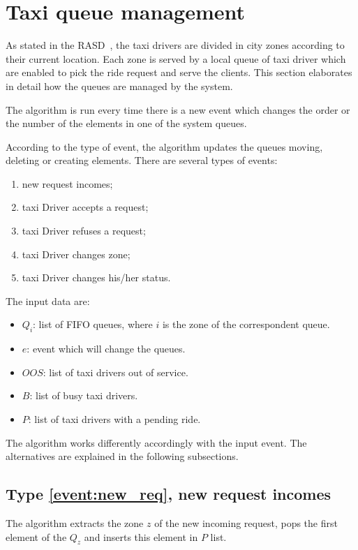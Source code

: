 \section{Taxi queue management}
As stated in the RASD~\cite{rasd}, the taxi drivers are divided in city zones according to their current location. Each zone is served by a local queue of taxi driver which are enabled to pick the ride request and serve the clients. This section elaborates in detail how the queues are managed by the system.

The algorithm is run every time there is a new event which changes the order or the number of the elements in one of the system queues.

According to the type of event, the algorithm updates the queues moving, deleting or creating elements. There are several types of events:
\begin{enumerate}
	\item new request incomes; \label{event:new_req}
	\item taxi Driver accepts a request; \label{event:accepted_req}
	\item taxi Driver refuses a request; \label{event:refuses_req}
	\item taxi Driver changes zone; \label{event:changed_zone}
	\item taxi Driver changes his/her status. \label{event:changed_status}
\end{enumerate}
The input data are:
\begin{itemize}
	\item $Q_i$: list of FIFO queues, where $i$ is the zone of the correspondent queue.
	\item $e$: event which will change the queues.
	\item $OOS$: list of taxi drivers out of service.
	\item $B$: list of busy taxi drivers.
	\item $P$: list of taxi drivers with a pending ride.
\end{itemize}

The algorithm works differently accordingly with the input event. The alternatives are explained in the following subsections.

\subsection{Type \ref{event:new_req}, new request incomes}
The algorithm extracts the zone $z$ of the new incoming request, pops the first element of the $Q_z$ and inserts this element in $P$ list.

